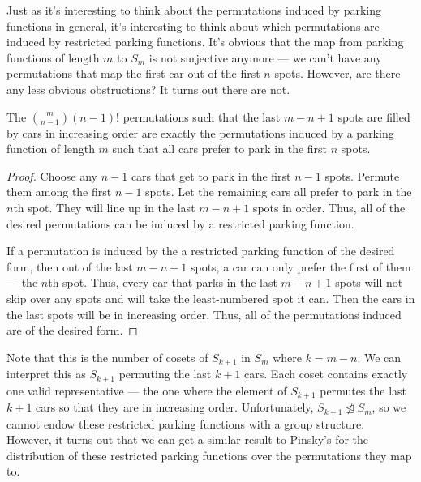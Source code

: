 Just as it's interesting to think about the permutations induced by parking functions in general, it's interesting to think about which permutations are induced by restricted parking functions. It's obvious that the map from parking functions of length $m$ to $S_m$ is not surjective anymore --- we can't have any permutations that map the first car out of the first $n$ spots. However, are there any less obvious obstructions? It turns out there are not.

\begin{proposition}
    The $\binom{m}{n - 1}(n - 1)!$ permutations such that the last $m - n + 1$ spots are filled by cars in increasing order are exactly the permutations induced by a parking function of length $m$ such that all cars prefer to park in the first $n$ spots.
\end{proposition}

\begin{proof}
    Choose any $n - 1$ cars that get to park in the first $n - 1$ spots. Permute them among the first $n - 1$ spots. Let the remaining cars all prefer to park in the $n$th spot. They will line up in the last $m - n + 1$ spots in order. Thus, all of the desired permutations can be induced by a restricted parking function.

    If a permutation is induced by the a restricted parking function of the desired form, then out of the last $m - n + 1$ spots, a car can only prefer the first of them --- the $n$th spot. Thus, every car that parks in the last $m - n + 1$ spots will not skip over any spots and will take the least-numbered spot it can. Then the cars in the last spots will be in increasing order. Thus, all of the permutations induced are of the desired form.
\end{proof}

Note that this is the number of cosets of $S_{k + 1}$ in $S_m$ where $k = m - n$. We can interpret this as $S_{k + 1}$ permuting the last $k + 1$ cars. Each coset contains exactly one valid representative --- the one where the element of $S_{k + 1}$ permutes the last $k + 1$ cars so that they are in increasing order. Unfortunately, $S_{k + 1} \not \trianglelefteq S_m$, so we cannot endow these restricted parking functions with a group structure. \\

However, it turns out that we can get a similar result to Pinsky's \cite{pinsky2024distribution} for the distribution of these restricted parking functions over the permutations they map to.

